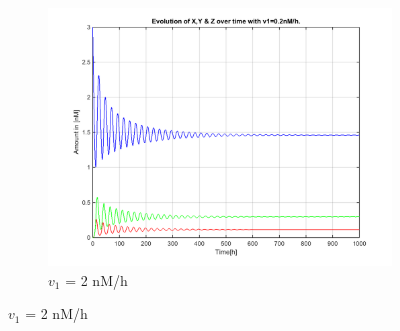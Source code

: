 \documentclass[10pt,a4paper,oneside,twocolumn]{article}
\numberwithin{equation}{section} %
\begin{document}
\begin{figure}
\begin{subfigure}[b]{0.32\textwidth}
	    \includegraphics[width=\textwidth]{LotsofthesameA/A-A2.png}
	    \caption{$v_1$ = 2 nM/h}
	\end{subfigure}
	 

\end{figure}
\end{document}
